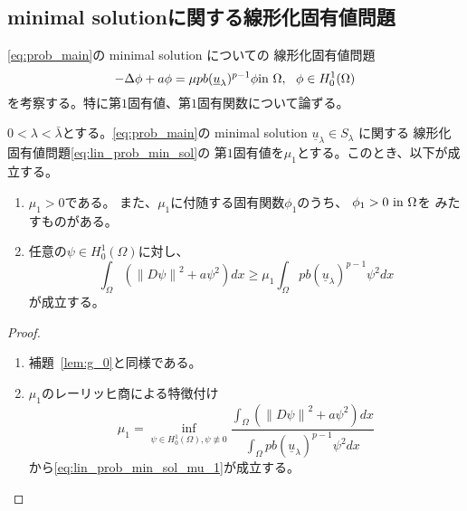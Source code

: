 \subsection{minimal solutionに関する線形化固有値問題}

\ref{eq:prob_main}の minimal solution についての
線形化固有値問題
\begin{equation}
 -\Delta \phi + a \phi = \mu p b (\underline{u}_\lambda)^{p-1} \phi
  \text{in}~ \Omega, \ \ \phi \in H_0^1(\Omega) \label{eq:lin_prob_min_sol}
\end{equation}
を考察する。特に第$1$固有値、第$1$固有関数について論ずる。

\begin{lem}
 $0 < \lambda < \bar{\lambda}$とする。\ref{eq:prob_main}の
 minimal solution $\underline{u}_\lambda \in S_\lambda$ に関する
 線形化固有値問題\eqref{eq:lin_prob_min_sol}の
 第$1$固有値を$\mu_1$とする。このとき、以下が成立する。
 \begin{enumerate}[1.]
  \item $\mu_1 > 0$である。
        また、$\mu_1$に付随する固有関数$\phi_1$のうち、
        $\phi_1 > 0 ~\text{in}~ \Omega$を
        みたすものがある。
  \item 任意の$\psi \in H_0^1(\Omega)$に対し、
        \begin{equation}
         \int_\Omega \left( \left\| D\psi \right\|^2 + a\psi^2 \right)
          dx \geq \mu_1 \int_\Omega pb(\underline{u}_\lambda)^{p-1}
          \psi^2 dx \label{eq:lin_prob_min_sol_mu_1}
        \end{equation}
        が成立する。
 \end{enumerate}
\end{lem}

\begin{proof}
 \begin{enumerate}[1.]
  \item 補題~\ref{lem:g_0}と同様である。
  \item $\mu_1$のレーリッヒ商による特徴付け
        \[
         \mu_1 = \inf_{\psi \in H_0^1(\Omega), \psi \not \equiv 0} 
        \frac{\displaystyle \int_\Omega 
        \left( \left\| D\psi \right\|^2 + a\psi^2 \right)
          dx }{\displaystyle \int_\Omega pb(\underline{u}_\lambda)^{p-1}
          \psi^2 dx }
        \]
        から\eqref{eq:lin_prob_min_sol_mu_1}が成立する。
 \end{enumerate}
\end{proof}
